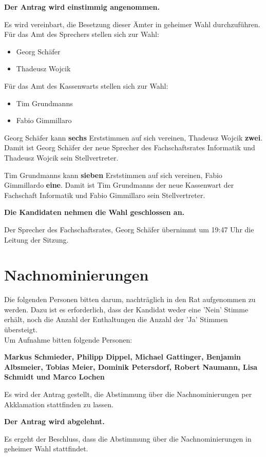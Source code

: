 \documentclass[a4paper, 11pt]{article} %
\begin{document}
\begin{center}
	\textbf{Der Antrag wird einstimmig angenommen.}
\end{center}
Es wird vereinbart, die Besetzung dieser Ämter in geheimer Wahl durchzuführen.
Für das Amt des Sprechers stellen sich zur Wahl:
\begin{itemize}
	\item Georg Schäfer
	\item Thadeusz Wojcik
\end{itemize}
Für das Amt des Kassenwarts stellen sich zur Wahl:
\begin{itemize}
	\item Tim Grundmanns
	\item Fabio Gimmillaro
\end{itemize}
\vspace{1.0cm}
Georg Schäfer kann \textbf{sechs} Erststimmen auf sich vereinen, Thadeusz Wojcik \textbf{zwei}.\\
Damit ist Georg Schäfer der neue Sprecher des Fachschaftsrates Informatik und Thadeusz Wojcik sein Stellvertreter.
\begin{flushleft}
Tim Grundmanns kann \textbf{sieben} Erststimmen auf sich vereinen, Fabio Gimmillardo \textbf{eine}.
Damit ist Tim Grundmanns der neue Kassenwart der Fachschaft Informatik und Fabio Gimmillaro sein Stellvertreter.
\end{flushleft}

\begin{center}
	\textbf{Die Kandidaten nehmen die Wahl geschlossen an.}
\end{center}
Der Sprecher des Fachschaftsrates, Georg Schäfer übernimmt um 19:47 Uhr die Leitung der Sitzung.

\section{Nachnominierungen}
Die folgenden Personen bitten darum, nachträglich in den Rat aufgenommen zu werden. Dazu ist es erforderlich, dass der Kandidat weder eine 'Nein' Stimme erhält, noch die Anzahl der Enthaltungen die Anzahl der 'Ja' Stimmen übersteigt.\\
Um Aufnahme bitten folgende Personen:
\begin{flushleft}
	\textbf{Markus Schmieder, Philipp Dippel, Michael Gattinger, Benjamin Albsmeier, Tobias Meier, Dominik Petersdorf, Robert Naumann, Lisa Schmidt und Marco Lochen}
\end{flushleft}
\vspace{0.5cm}
Es wird der Antrag gestellt, die Abstimmung über die Nachnominierungen per Akklamation stattfinden zu lassen.
\begin{center}
	\textbf{Der Antrag wird abgelehnt.}
\end{center}
Es ergeht der Beschluss, dass die Abstimmung über die Nachnominierungen in geheimer Wahl stattfindet.
\end{document}
